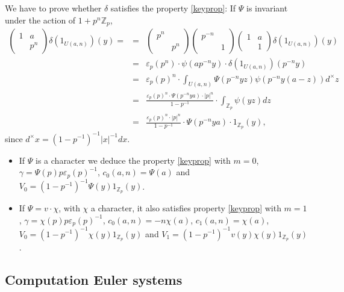\documentclass{amsart}
\newcommand{\Z}{{\mathbb Z}}
\begin{document}
We have to prove whether $\delta$ satisfies the property \eqref{keyprop}:
If $\Psi$ is invariant under the action of $1+p^n\Z_p$,
\begin{eqnarray*}
\left(\begin{smallmatrix}1&a\\&p^n\end{smallmatrix}\right)\delta(1_{U(a,n)})(y)=&=&\left(\begin{smallmatrix}p^{n}&\\&p^n\end{smallmatrix}\right)\left(\begin{smallmatrix}p^{-n}&\\&1\end{smallmatrix}\right)\left(\begin{smallmatrix}1&a\\&1\end{smallmatrix}\right)\delta(1_{U(a,n)})(y)\\
&=&\varepsilon_p(p^{n})\cdot \psi(ap^{-n}y)\cdot\delta(1_{U(a,n)})(p^{-n}y)\\
&=&\varepsilon_p(p)^{n}\cdot \int_{U(a,n)}\Psi(p^{-n}yz)\psi(p^{-n}y(a-z))d^\times z\\
&=&\frac{\varepsilon_p(p)^{n}\cdot\Psi(p^{-n}ya)\cdot |p|^n}{1-p^{-1}}\cdot\int_{\Z_p}\psi(yz)d z\\
&=&\frac{\varepsilon_p(p)^{n}\cdot |p|^n}{1-p^{-1}}\cdot\Psi(p^{-n}ya)\cdot 1_{\Z_p}(y),
\end{eqnarray*}
since $d^\times x=(1-p^{-1})^{-1}|x|^{-1}dx$.
\begin{itemize}
\item If $\Psi$ is a character we deduce the property \eqref{keyprop} with $m=0$, $\gamma=\Psi(p)p\varepsilon_p(p)^{-1}$, $c_0(a,n)=\Psi(a)$ and $V_0=(1-p^{-1})^{-1}\Psi(y) 1_{\Z_p}(y)$. 

\item If $\Psi=v\cdot\chi$, with $\chi$ a character, it also satisfies property \eqref{keyprop} with $m=1$, $\gamma=\chi(p)p\varepsilon_p(p)^{-1}$, $c_0(a,n)=-n\chi(a)$, $c_1(a,n)=\chi(a)$, $V_0=(1-p^{-1})^{-1}\chi(y) 1_{\Z_p}(y)$ and $V_1=(1-p^{-1})^{-1}v(y)\chi(y) 1_{\Z_p}(y)$.
\end{itemize}


\subsection{Computation Euler systems}
\end{document}
